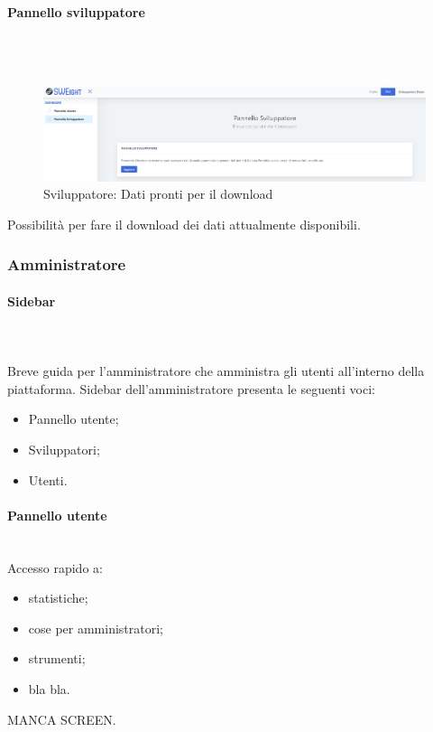     	\paragraph{Pannello sviluppatore}\mbox{}\\ \\
    		\begin{figure}[H]
			\centering
			\includegraphics[width=17cm]{sez/img/sviluppatore/datipronti.PNG}
			\caption{Sviluppatore: Dati pronti per il download}\label{fig:1}
			\end{figure}
		  Possibilità per fare il download dei dati attualmente disponibili.




	\newpage
	\subsubsection{Amministratore}
		\paragraph{Sidebar}\mbox{}\\ \\
		  Breve guida per l'amministratore che amministra gli utenti all'interno della piattaforma. Sidebar dell'amministratore presenta le seguenti voci:
			\begin{itemize}
			\item Pannello utente;
			\item Sviluppatori;
			\item Utenti.
			\end{itemize}



		\paragraph{Pannello utente}\mbox{}\\
		  Accesso rapido a:
			\begin{itemize}
			\item statistiche;
			\item cose per amministratori;
			\item strumenti;
			\item bla bla.
			\end{itemize}
			  MANCA SCREEN.




